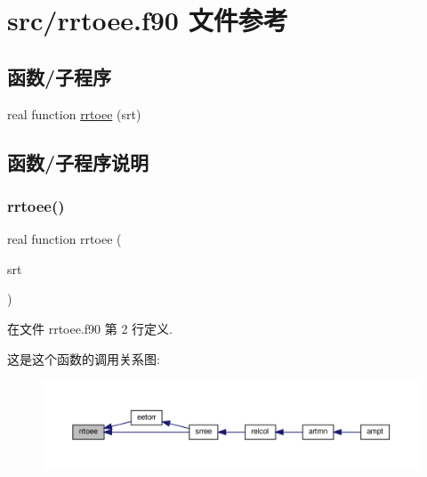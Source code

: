 \hypertarget{rrtoee_8f90}{}\section{src/rrtoee.f90 文件参考}
\label{rrtoee_8f90}
\subsection*{函数/子程序}
\begin{DoxyCompactItemize}
\item 
real function \mbox{\hyperlink{rrtoee_8f90_a4231bf2ec9803b21562b2246dc91356a}{rrtoee}} (srt)
\end{DoxyCompactItemize}


\subsection{函数/子程序说明}
\mbox{\label{rrtoee_8f90_a4231bf2ec9803b21562b2246dc91356a}} 
\subsubsection{\texorpdfstring{rrtoee()}{rrtoee()}}
{\footnotesize\ttfamily real function rrtoee (\begin{DoxyParamCaption}\item[{}]{srt }\end{DoxyParamCaption})}



在文件 rrtoee.\+f90 第 2 行定义.

这是这个函数的调用关系图\+:
\nopagebreak
\begin{figure}[H]
\begin{center}
\leavevmode
\includegraphics[width=350pt]{rrtoee_8f90_a4231bf2ec9803b21562b2246dc91356a_icgraph}
\end{center}
\end{figure}

